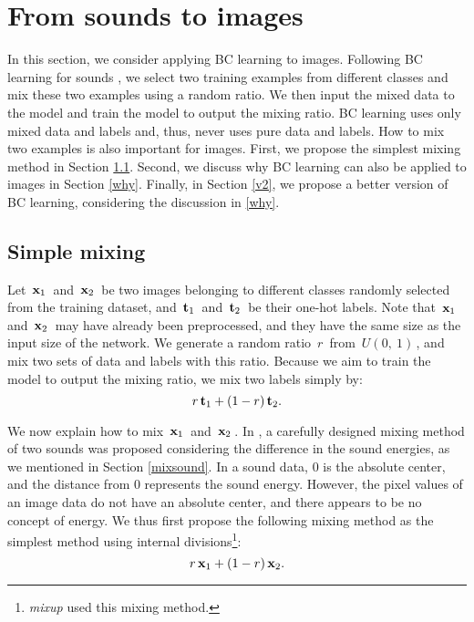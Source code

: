\documentclass[10pt,twocolumn,letterpaper]{article}
\begin{document}

\section{From sounds to images}\label{3}
In this section, we consider applying BC learning to images. Following BC learning for sounds \cite{tokozume2018learning}, we select two training examples from different classes and mix these two examples using a random ratio. We then input the mixed data to the model and train the model to output the mixing ratio. BC learning uses only mixed data and labels and, thus, never uses pure data and labels. How to mix two examples is also important for images. First, we propose the simplest mixing method in Section \ref{v1}. Second, we discuss why BC learning can also be applied to images in Section \ref{why}. Finally, in Section \ref{v2}, we propose a better version of BC learning, considering the discussion in \ref{why}.

\subsection{Simple mixing}\label{v1}
Let $\, {\bf x}_1\, $ and $\, {\bf x}_2 \,$ be two images belonging to different classes randomly selected from the training dataset, and $\, {\bf t}_1\, $ and $\, {\bf t}_2 \,$ be their one-hot labels. Note that $\, {\bf x}_1\, $ and $\, {\bf x}_2 \,$ may have already been preprocessed, and they have the same size as the input size of the network. We generate a random ratio $\, r \,$ from $\, U(0,\ 1) \,$, and mix two sets of data and labels with this ratio. Because we aim to train the model to output the mixing ratio, we mix two labels simply by:
\begin{equation}
r \, {\bf t}_1 + (1-r) \, {\bf t}_2.
\end{equation}

We now explain how to mix $\, {\bf x}_1 \,$ and $\, {\bf x}_2 \,$. In \cite{tokozume2018learning}, a carefully designed mixing method of two sounds was proposed considering the difference in the sound energies, as we mentioned in Section \ref{mixsound}. In a sound data, $0$ is the absolute center, and the distance from $0$ represents the sound energy. However, the pixel values of an image data do not have an absolute center, and there appears to be no concept of energy. We thus first propose the following mixing method as the simplest method using internal divisions\footnote{{\it mixup} \cite{zhang2017mixup} used this mixing method.}:
\begin{equation}
 \label{eqn:v1}
  r \, {\bf x}_1 + (1-r) \, {\bf x}_2.
\end{equation}
\end{document}

